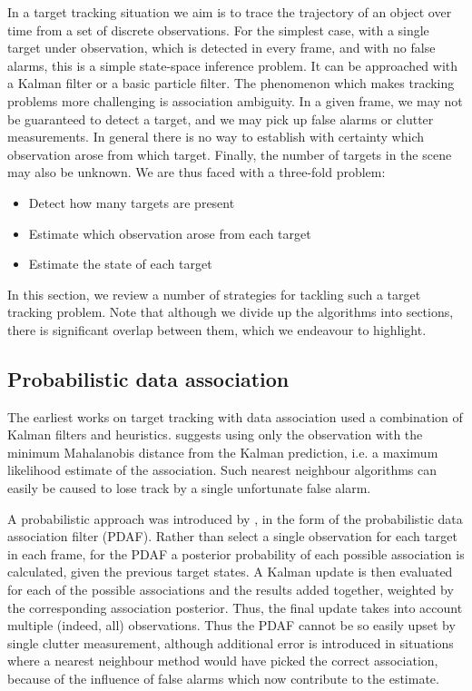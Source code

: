 In a target tracking situation we aim is to trace the trajectory of an object over time from a set of discrete observations. For the simplest case, with a single target under observation, which is detected in every frame, and with no false alarms, this is a simple state-space inference problem. It can be approached with a Kalman filter or a basic particle filter. The phenomenon which makes tracking problems more challenging is association ambiguity. In a given frame, we may not be guaranteed to detect a target, and we may pick up false alarms or clutter measurements. In general there is no way to establish with certainty which observation arose from which target. Finally, the number of targets in the scene may also be unknown. We are thus faced with a three-fold problem:

\begin{itemize}
	\item Detect how many targets are present
	\item Estimate which observation arose from each target
	\item Estimate the state of each target
\end{itemize}

In this section, we review a number of strategies for tackling such a target tracking problem. Note that although we divide up the algorithms into sections, there is significant overlap between them, which we endeavour to highlight.

\subsection{Probabilistic data association}
The earliest works on target tracking with data association used a combination of Kalman filters and heuristics. \cite{Sea1971} suggests using only the observation with the minimum Mahalanobis distance from the Kalman prediction, i.e. a maximum likelihood estimate of the association. Such nearest neighbour algorithms can easily be caused to lose track by a single unfortunate false alarm.

A probabilistic approach was introduced by \cite{Bar-Shalom1975}, in the form of the probabilistic data association filter (PDAF). Rather than select a single observation for each target in each frame, for the PDAF a posterior probability of each possible association is calculated, given the previous target states. A Kalman update is then evaluated for each of the possible associations and the results added together, weighted by the corresponding association posterior. Thus, the final update takes into account multiple (indeed, all) observations. Thus the PDAF cannot be so easily upset by single clutter measurement, although additional error is introduced in situations where a nearest neighbour method would have picked the correct association, because of the influence of false alarms which now contribute to the estimate.

